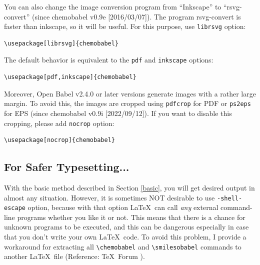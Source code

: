 \documentclass[12pt]{ltjsarticle}
\def\Lpack#1{\textsf{#1}}
\def\Lver#1{\Lpack{chemobabel} #1}
\begin{document}
You can also change the image conversion program from ``Inkscape'' to
``rsvg-convert'' (since \Lver{v0.9e [2016/03/07]}).
The program rsvg-convert is faster than inkscape, so it will be useful.
For this purpose, use \verb|librsvg| option:
\begin{verbatim}
\usepackage[librsvg]{chemobabel}
\end{verbatim}
The default behavior is equivalent to the \verb|pdf| and \verb|inkscape| options:
\begin{verbatim}
\usepackage[pdf,inkscape]{chemobabel}
\end{verbatim}

Moreover, Open Babel v2.4.0 or later versions generate images with
a rather large margin. To avoid this, the images are cropped
using \verb|pdfcrop| for PDF or \verb|ps2eps| for EPS
(since \Lver{v0.9i [2022/09/12]}).
If you want to disable this cropping, please add \verb|nocrop| option:
\begin{verbatim}
\usepackage[nocrop]{chemobabel}
\end{verbatim}

\clearpage

\subsection{For Safer Typesetting...}
\label{extract}

With the basic method described in Section \ref{basic},
you will get desired output in almost any situation.
However, it is sometimes NOT desirable to use \verb|-shell-escape| option,
because with that option \LaTeX\ can call \emph{any} external command-line
programs whether you like it or not.
This means that there is a chance for unknown programs to be executed,
and this can be dangerous especially in case that you don't write your
own \LaTeX\ code. To avoid this problem, I provide a workaround for
extracting all \verb|\chemobabel| and \verb|\smilesobabel| commands
to another \LaTeX\ file (Reference: \TeX\ Forum \cite{OKU}).
\end{document}
